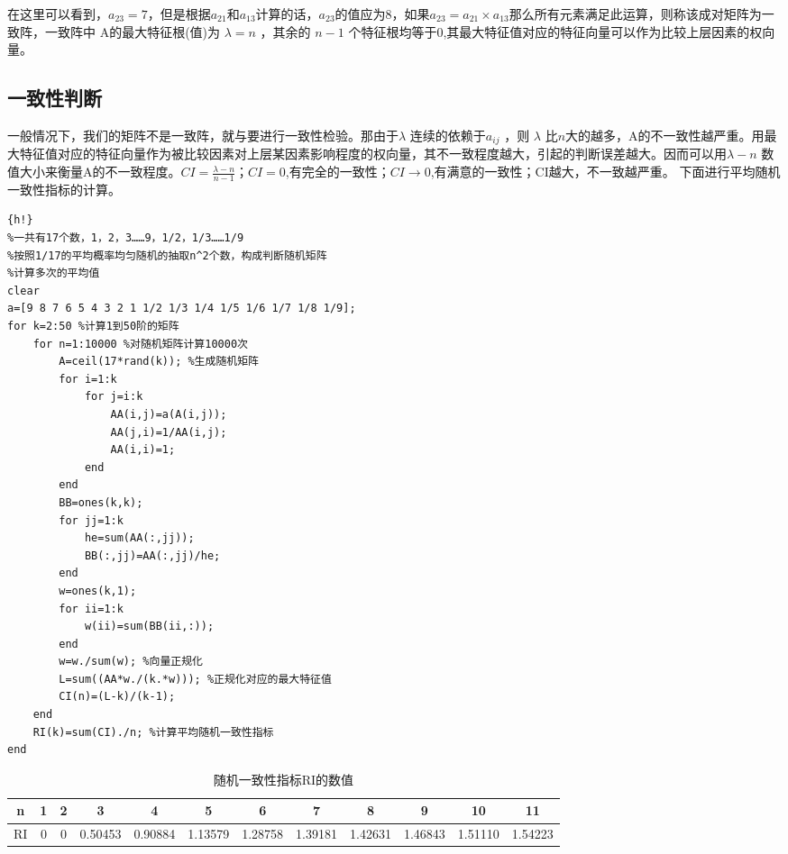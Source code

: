 \documentclass{ctexart}
\begin{document}
\setlength{\parindent}{2em}在这里可以看到，$a_{23}=7$，但是根据$a_{21}$和$a_{13}$计算的话，$a_{23}$的值应为8，如果$a_{23}=a_{21} \times a_{13}$那么所有元素满足此运算，则称该成对矩阵为一致阵，一致阵中 A的最大特征根(值)为 $\lambda=n$ ，其余的 $n-1$ 个特征根均等于0,其最大特征值对应的特征向量可以作为比较上层因素的权向量。

\subsection{一致性判断}
 \setlength{\parindent}{2em}一般情况下，我们的矩阵不是一致阵，就与要进行一致性检验。那由于$\lambda$ 连续的依赖于$a_{ij}$ ，则 $\lambda$ 比$n$大的越多，A的不一致性越严重。用最大特征值对应的特征向量作为被比较因素对上层某因素影响程度的权向量，其不一致程度越大，引起的判断误差越大。因而可以用$\lambda-n$ 数值大小来衡量A的不一致程度。$CI=\frac{\lambda-n}{n-1}$；$CI=0$,有完全的一致性；$CI\rightarrow0$,有满意的一致性；CI越大，不一致越严重。
 下面进行平均随机一致性指标的计算。
 
 
\begin{lstlisting}{h!}
%一共有17个数，1，2，3……9，1/2，1/3……1/9
%按照1/17的平均概率均匀随机的抽取n^2个数，构成判断随机矩阵
%计算多次的平均值
clear
a=[9 8 7 6 5 4 3 2 1 1/2 1/3 1/4 1/5 1/6 1/7 1/8 1/9];
for k=2:50 %计算1到50阶的矩阵
    for n=1:10000 %对随机矩阵计算10000次
        A=ceil(17*rand(k)); %生成随机矩阵
        for i=1:k
            for j=i:k
                AA(i,j)=a(A(i,j));
                AA(j,i)=1/AA(i,j);
                AA(i,i)=1;
            end
        end
        BB=ones(k,k);
        for jj=1:k
            he=sum(AA(:,jj));
            BB(:,jj)=AA(:,jj)/he;
        end
        w=ones(k,1);
        for ii=1:k
            w(ii)=sum(BB(ii,:));
        end
        w=w./sum(w); %向量正规化
        L=sum((AA*w./(k.*w))); %正规化对应的最大特征值
        CI(n)=(L-k)/(k-1);
    end
    RI(k)=sum(CI)./n; %计算平均随机一致性指标
end
\end{lstlisting}


\begin{table}[h!]
\centering
\caption{随机一致性指标RI的数值}
\resizebox{\textwidth}{!}
{
 \begin{tabular}{|c|c|c|c|c|c|c|c|c|c|c|c|}
 \hline
 n & 1 & 2 & 3 & 4 & 5 & 6 & 7 & 8 & 9 & 10 & 11\\
 \hline
RI& 0 & 0 & 0.50453 & 0.90884 & 1.13579	&1.28758	&1.39181	&1.42631	&1.46843	&1.51110	&1.54223\\
\hline
\end{tabular}
}
\label{表:4}
\end{table}
\end{document}
